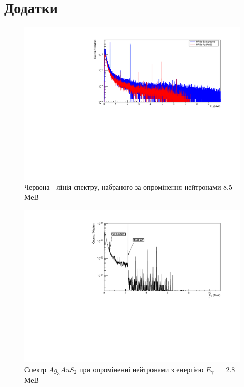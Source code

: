\documentclass[a4paper, 14pt]{article}
\numberwithin{equation}{section}
\numberwithin{table}{section}
\begin{document}
\section{Додатки}
\setcounter{figure}{0}
\begin{figure}[h!]
	\centering \includegraphics[width=1\textwidth]{res/Ag3AuS2_8_5MeVFonClasic.pdf}
	\caption{Червона - лінія спектру, набраного за опромінення нейтронами 8.5 МеВ}
	\label{ris:Ag3AuS28_5MeV}	
\end{figure} 
\begin{figure}[h!]
	\centering \includegraphics[width=1\textwidth]{res/AuAgS28MeV.pdf}
	\caption{ Спектр $Ag_3AuS_2$ при опроміненні нейтронами з енергією $E_{\gamma} = $ 2.8 МеВ}
	\label{ris:Ag3AuS22_8MeV}	
\end{figure}
\end{document}
